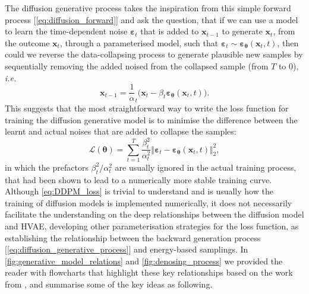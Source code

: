 The diffusion generative process takes the inspiration from this simple forward process [\cref{eq:diffusion_forward}] and ask the question, that if we can use a model to learn the time-dependent noise $\boldsymbol{\varepsilon}_t$ that is added to $\bm{x}_{t-1}$ to generate $\bm{x}_t$, from the outcome $\bm{x}_t$, through a parameterised model, such that $\boldsymbol{\varepsilon}_t\sim\boldsymbol{\varepsilon}_{\boldsymbol{\theta}}(\bm{x}_t,t)$, then could we reverse the data-collapsing process to generate plausible new samples by sequentially removing the added noised from the collapsed sample (from $T$ to 0), \emph{i.e.}
\begin{equation}
    \label{eq:diffusion_generative_process}
\bm{x}_{t-1}=\frac{1}{\alpha}_t\big(\bm{x}_t-\beta_t \boldsymbol{\varepsilon}_{\boldsymbol{\theta}}(\bm{x}_t,t) \big).
\end{equation}
This suggests that the most straightforward way to write the loss function for training the diffusion generative model is to minimise the difference between the learnt and actual noises that are added to collapse the samples:
\begin{equation}
    \label{eq:DDPM_loss}
    \mathcal{L}(\boldsymbol{\theta})=\sum_{t=1}^{T}\frac{\beta_t^2}{\alpha_t^2}\big\Vert \boldsymbol{\varepsilon}_t -\boldsymbol{\varepsilon}_{\boldsymbol{\theta}}(\bm{x}_t,t)\big\Vert_2^2,
\end{equation}
in which the prefactors $\beta_t^2/\alpha_t^2$ are usually ignored in the actual training process, that had been shown to lead to a numerically more stable training curve.\cite{ho2020denoising} Although \cref{eq:DDPM_loss} is trivial to understand and is usually how the training of diffusion models is implemented numerically, it does not necessarily facilitate the understanding on the deep relationships between the diffusion model and HVAE,  developing other parameterisation strategies for the loss function, as establishing the relationship between the backward generation process [\cref{eq:diffusion_generative_process}] and energy-based samplings. In \cref{fig:generative_model_relations} and \cref{fig:denosing_process} we provided the reader with flowcharts that highlight these key relationships based on the work from \citet{luo2022understanding}, and summarise some of the key ideas as following.

